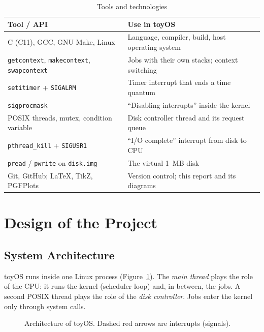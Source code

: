 \documentclass[12pt,a4paper]{article}
\begin{document}
\begin{table}[H]
\centering
\caption{Tools and technologies}
\small
\begin{tabularx}{\textwidth}{@{}>{\raggedright\arraybackslash}p{6.2cm}X@{}}
\toprule
\textbf{Tool / API} & \textbf{Use in toyOS} \\
\midrule
C (C11), GCC, GNU Make, Linux & Language, compiler, build, host operating system \\
\texttt{getcontext}, \texttt{makecontext}, \texttt{swapcontext} & Jobs with their own stacks; context switching \\
\texttt{setitimer} + \texttt{SIGALRM} & Timer interrupt that ends a time quantum \\
\texttt{sigprocmask} & ``Disabling interrupts'' inside the kernel \\
POSIX threads, mutex, condition variable & Disk controller thread and its request queue \\
\texttt{pthread\_kill} + \texttt{SIGUSR1} & ``I/O complete'' interrupt from disk to CPU \\
\texttt{pread} / \texttt{pwrite} on \texttt{disk.img} & The virtual 1~MB disk \\
Git, GitHub; \LaTeX, TikZ, PGFPlots & Version control; this report and its diagrams \\
\bottomrule
\end{tabularx}
\end{table}

\section{Design of the Project}

\subsection{System Architecture}

toyOS runs inside one Linux process (Figure~\ref{fig:arch}). The \emph{main thread} plays the role of the CPU: it runs the kernel (scheduler loop) and, in between, the jobs. A second POSIX thread plays the role of the \emph{disk controller}. Jobs enter the kernel only through system calls.

\begin{figure}[H]
\centering

\caption{Architecture of toyOS. Dashed red arrows are interrupts (signals).}
\label{fig:arch}
\end{figure}
\end{document}

